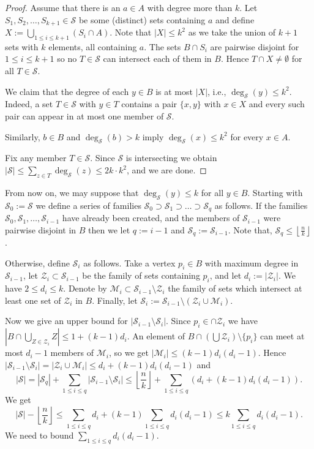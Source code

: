 \documentclass[12pt,a4paper]{amsart}
\numberwithin{equation}{section}
\theoremstyle{plain}
\theoremstyle{definition}
\newcommand{\m}{\mathcal}
\newcommand{\trivup}{\left\lfloor\frac{n}{k}\right\rfloor}
\begin{document}
\begin{proof}
Assume that there is an $a \in A$  with degree more than $k$. Let $S_1, S_2, \ldots , S_{k+1} \in \m{S}$ be some (distinct) sets containing $a$ and define $X:=  \bigcup_{1\leq i \leq k+1} (S_i \cap A)$.
Note that $|X| \leq k^2$ as we take the union of $k+1$ sets with $k$ elements, all containing $a$.
The sets $B\cap S_i$ are pairwise disjoint for $1\leq i \leq k+1$ so no $T \in \m{S}$ can intersect each of them in $B$.
Hence $T \cap X \neq \emptyset$ for all $T \in \m{S}$.

We claim that the degree of each $y\in B$ is at most $|X|$, i.e., $\deg_{\m{S}}(y)\leq k^2$. Indeed, a set $T\in \m{S}$ with $y\in T$ contains a pair $\{ x, y\}$ with $x\in X$ and every such pair can appear in at most one member of $\m{S}$.

Similarly, $b\in B$ and $\deg_{\m{S}}(b)>k$ imply $\deg_{\m{S}}(x)\leq k^2$ for every $x\in A$.

Fix any member $T\in \m{S}$. Since $\m{S}$ is intersecting we obtain
$|\m{S}|\leq \sum_{z\in T}\deg_{\m{S}}(z) \leq 2k\cdot k^2$, and we are done.
\end{proof}

From now on, we may suppose that  $\deg_{\m{S}}(y)\leq k$ for all $y \in B$.
Starting with $\m{S}_0:=\m{S}$ we define a series of families $\m{S}_0 \supset \m{S}_1 \supset \ldots \supset \m{S}_q$ as follows. %
If the families $\m{S}_0, \m{S}_1, \ldots , \m{S}_{i-1}$ have already been created, and the members of $\m{S}_{i-1}$ were pairwise disjoint in $B$ then we let $q:=i-1$ and $\m{S}_{q}:=\m{S}_{i-1}$.  Note that, $\m{S}_{q} \leq\left\lfloor\frac{n}{k}\right\rfloor$.

Otherwise, define $\m{S}_i$ as follows.
Take a vertex $p_i \in B$ with maximum degree in $\m{S}_{i-1}$, let $\mathcal{Z}_i \subset \m{S}_{i-1}$ be the family of sets containing $p_i$, and let $d_i:=|\m{Z}_i|$. We have $2 \leq d_i \leq k$.
Denote by $\mathcal{M}_{i} \subset \m{S}_{i-1} \setminus \m{Z}_i$ the family of sets which intersect at least one set of $\mathcal{Z}_{i}$ in $B$. Finally, let $\m{S}_i:=\m{S}_{i-1} \setminus (\m{Z}_i \cup \m{M}_i)$.

Now we give an upper bound for $|\m{S}_{i-1} \setminus \m{S}_{i}|$.
Since $p_i\in \cap \m{Z}_i$ we have
$\left|B \cap \bigcup_{Z \in \m{Z}_i} Z \right| \leq 1+(k-1)d_i$.
An element of $B \cap \left( \bigcup \m{Z}_i\right) \setminus \{ p_i\}$ can meet at most $d_i-1$
 members of $\mathcal{M}_{i}$, so we get $|\m{M}_i| \leq (k-1)d_i(d_i-1)$.
Hence $|\m{S}_{i-1} \setminus \m{S}_{i}|=|\m{Z}_i \cup \m{M}_i| \leq d_i+(k-1)d_i(d_i-1)$ and
$$|\m{S}|=|\m{S}_q|+\sum_{1\leq i\leq q} |\m{S}_{i-1} \setminus \m{S}_i| \leq \trivup+\sum_{1\leq i\leq q} (d_i+(k-1)d_i(d_i-1)).
$$
We get
$$  |\m{S}|-\trivup \leq \sum_{1\leq i\leq q} d_i+(k-1)\sum_{1\leq i\leq q} d_i(d_i-1) \leq k \sum_{1\leq i\leq q} d_i(d_i-1).
$$
We need to bound $\sum_{1\leq i\leq q}  d_i(d_i-1)$.
\end{document}

